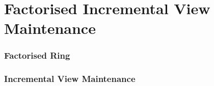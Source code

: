 \chapter{Factorised Incremental View Maintenance}

\subsection{Factorised Ring}
\subsection{Incremental View Maintenance}

